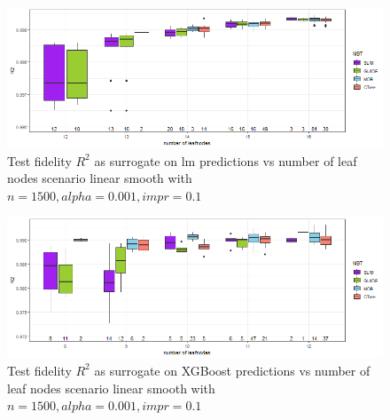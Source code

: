 \begin{figure}[!htb]
     \centering
    \includegraphics[width=14cm]{Figures/simulations/chapter_5_simulation_study/basic_scenarios/linear_smooth/ls_1000_lm_r2_test.png}
    \caption{Test fidelity $R^2$ as surrogate on lm predictions vs number of leaf nodes scenario linear smooth with $n=1500, alpha = 0.001, impr = 0.1$}
\label{fig:app_ls_1000_lm_r2_test}
\end{figure} 

\begin{figure}[!htb]
     \centering     
    \includegraphics[width=14cm]{Figures/simulations/chapter_5_simulation_study/basic_scenarios/linear_smooth/ls_1000_xgboost_r2_test.png}
    \caption{Test fidelity $R^2$ as surrogate on XGBoost predictions vs number of leaf nodes scenario linear smooth with $n=1500, alpha = 0.001, impr = 0.1$}
    \label{fig:app_ls_1000_xgboost_r2_test}
\end{figure} 




